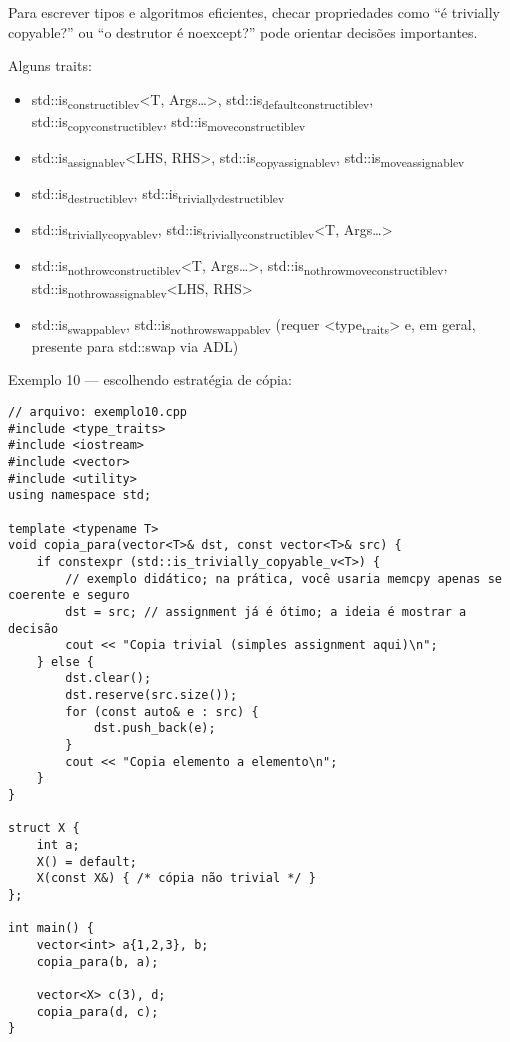 \documentclass[11pt]{article}
\begin{document}
Para escrever tipos e algoritmos eficientes, checar propriedades como “é trivially copyable?” ou “o destrutor é noexcept?” pode orientar decisões importantes.

Alguns traits:
\begin{itemize}
\item std::is\textsubscript{constructible}\textsubscript{v}<T, Args\ldots{}>, std::is\textsubscript{default}\textsubscript{constructible}\textsubscript{v}, std::is\textsubscript{copy}\textsubscript{constructible}\textsubscript{v}, std::is\textsubscript{move}\textsubscript{constructible}\textsubscript{v}
\item std::is\textsubscript{assignable}\textsubscript{v}<LHS, RHS>, std::is\textsubscript{copy}\textsubscript{assignable}\textsubscript{v}, std::is\textsubscript{move}\textsubscript{assignable}\textsubscript{v}
\item std::is\textsubscript{destructible}\textsubscript{v}, std::is\textsubscript{trivially}\textsubscript{destructible}\textsubscript{v}
\item std::is\textsubscript{trivially}\textsubscript{copyable}\textsubscript{v}, std::is\textsubscript{trivially}\textsubscript{constructible}\textsubscript{v}<T, Args\ldots{}>
\item std::is\textsubscript{nothrow}\textsubscript{constructible}\textsubscript{v}<T, Args\ldots{}>, std::is\textsubscript{nothrow}\textsubscript{move}\textsubscript{constructible}\textsubscript{v}, std::is\textsubscript{nothrow}\textsubscript{assignable}\textsubscript{v}<LHS, RHS>
\item std::is\textsubscript{swappable}\textsubscript{v}, std::is\textsubscript{nothrow}\textsubscript{swappable}\textsubscript{v} (requer <type\textsubscript{traits}> e, em geral, presente para std::swap via ADL)
\end{itemize}

Exemplo 10 — escolhendo estratégia de cópia:
\begin{verbatim}
// arquivo: exemplo10.cpp
#include <type_traits>
#include <iostream>
#include <vector>
#include <utility>
using namespace std;

template <typename T>
void copia_para(vector<T>& dst, const vector<T>& src) {
    if constexpr (std::is_trivially_copyable_v<T>) {
        // exemplo didático; na prática, você usaria memcpy apenas se coerente e seguro
        dst = src; // assignment já é ótimo; a ideia é mostrar a decisão
        cout << "Copia trivial (simples assignment aqui)\n";
    } else {
        dst.clear();
        dst.reserve(src.size());
        for (const auto& e : src) {
            dst.push_back(e);
        }
        cout << "Copia elemento a elemento\n";
    }
}

struct X {
    int a;
    X() = default;
    X(const X&) { /* cópia não trivial */ }
};

int main() {
    vector<int> a{1,2,3}, b;
    copia_para(b, a);

    vector<X> c(3), d;
    copia_para(d, c);
}
\end{verbatim}
\end{document}
